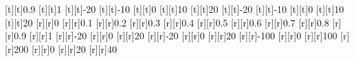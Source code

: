 \begin{psfrags}
[t][t]{0.9}%
[t][t]{1}%
[t][t]{-20}%
[t][t]{-10}%
[t][t]{0}%
[t][t]{10}%
[t][t]{20}%
[t][t]{-20}%
[t][t]{-10}%
[t][t]{0}%
[t][t]{10}%
[t][t]{20}%
%
[r][r]{0}%
[r][r]{0.1}%
[r][r]{0.2}%
[r][r]{0.3}%
[r][r]{0.4}%
[r][r]{0.5}%
[r][r]{0.6}%
[r][r]{0.7}%
[r][r]{0.8}%
[r][r]{0.9}%
[r][r]{1}%
[r][r]{-20}%
[r][r]{0}%
[r][r]{20}%
[r][r]{-20}%
[r][r]{0}%
[r][r]{20}%
%
[r][r]{-100}%
[r][r]{0}%
[r][r]{100}%
[r][r]{200}%
[r][r]{0}%
[r][r]{20}%
[r][r]{40}%
%
%
\end{psfrags}%
%
